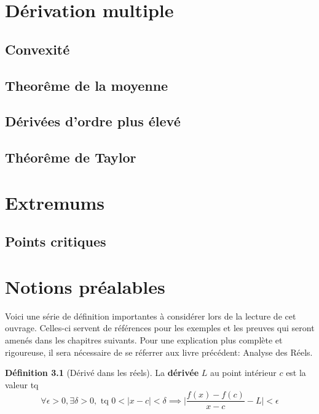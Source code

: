 \documentclass[12pt]{report}
\theoremstyle{definition}
\newtheorem{definition}{Définition}[section]
\begin{document}
\chapter{Dérivation multiple}
\section{Convexité}
\section{Theorême de la moyenne}
\section{Dérivées d'ordre plus élevé}
\section{Théorême de Taylor}
\chapter{Extremums}
\section{Points critiques}
\appendix
\chapter{Notions préalables}
    Voici une série de définition importantes à considérer lors de la lecture de cet ouvrage. Celles-ci servent
    de références pour les exemples et les preuves qui seront amenés dans les chapitres suivants. Pour une explication
    plus complète et rigoureuse, il sera nécessaire de se réferrer aux livre précédent: Analyse des Réels.

    \begin{definition}[Dérivé dans les réels]
        \label{def:derive_reels}
        La \textbf{dérivée} $L$ au point intérieur $c$ est la valeur tq 
        $$ \forall \epsilon > 0, \exists \delta > 0, \text{ tq } 0 < |x - c| < \delta \implies \big| \frac{f(x) - f(c)}{x - c} - L \big| < \epsilon $$
    \end{definition}
\end{document}
